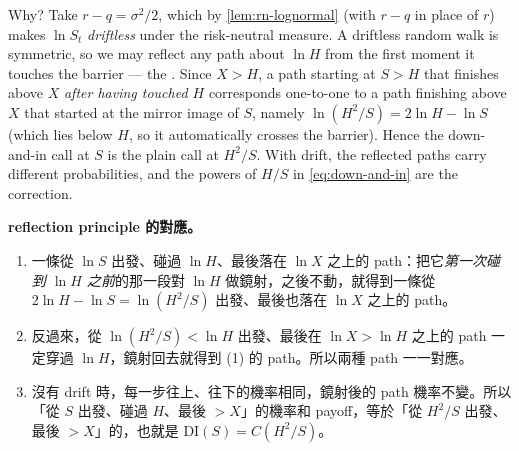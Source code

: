 Why?
\suppstart
Take $r-q=\sigma^{2}/2$, which by \autoref{lem:rn-lognormal} (with $r-q$ in place of $r$) makes $\ln S_{t}$ \emph{driftless} under the risk-neutral measure.
A driftless random walk is symmetric, so we may reflect any path about $\ln H$ from the first moment it touches the barrier --- the .
Since $X>H$, a path starting at $S>H$ that finishes above $X$ \emph{after having touched $H$} corresponds one-to-one to a path finishing above $X$ that started at the mirror image of $S$, namely $\ln(H^{2}/S)=2\ln H-\ln S$ (which lies below $H$, so it automatically crosses the barrier).
Hence the down-and-in call at $S$ is the plain call at $H^{2}/S$.
With drift, the reflected paths carry different probabilities, and the powers of $H/S$ in \eqref{eq:down-and-in} are the correction.


\begin{remark}[補充]
	\textbf{reflection principle 的對應。}
	\begin{enumerate}[(1),nosep]
		\item 一條從 $\ln S$ 出發、碰過 $\ln H$、最後落在 $\ln X$ 之上的 path：把它\emph{第一次碰到 $\ln H$ 之前}的那一段對 $\ln H$ 做鏡射，之後不動，就得到一條從 $2\ln H-\ln S=\ln(H^{2}/S)$ 出發、最後也落在 $\ln X$ 之上的 path。
		\item 反過來，從 $\ln(H^{2}/S)<\ln H$ 出發、最後在 $\ln X>\ln H$ 之上的 path 一定穿過 $\ln H$，鏡射回去就得到 (1) 的 path。所以兩種 path 一一對應。
		\item 沒有 drift 時，每一步往上、往下的機率相同，鏡射後的 path 機率不變。所以「從 $S$ 出發、碰過 $H$、最後 $>X$」的機率和 payoff，等於「從 $H^{2}/S$ 出發、最後 $>X$」的，也就是 $\mathrm{DI}(S)=C(H^{2}/S)$。
	\end{enumerate}
\end{remark}

